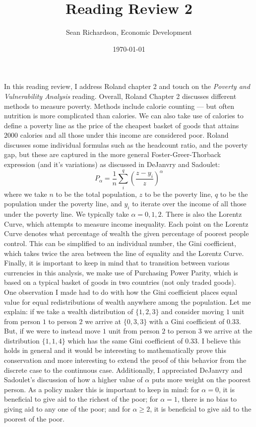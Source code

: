 \documentclass[12pt]{amsart}
\begin{document}
\author{Sean Richardson, Economic Development}
\title{Reading Review 2}
\date{\today}
\maketitle

In this reading review, I address Roland chapter 2 and touch on the
\textit{Poverty and Vulnerability Analysis} reading. Overall, Roland
Chapter 2 discusses different methods to measure poverty. Methods include
calorie counting --- but often nutrition is more complicated than calories.
We can also take use of calories to define a poverty line as the price of
the cheapest basket of goods that attains $2000$ calories and all those
under this income are considered poor. 
Roland discusses some individual formulas such as the headcount ratio, and
the poverty gap, but these are captured in the more general
Foster-Greer-Thorback expression (and it's variations) as discussed in DeJanvry and Sadoulet: 
$$P_\alpha = \frac{1}{n}\sum_i^q\left(\frac{z-y_i}{z}\right)^\alpha$$
where we take $n$ to be the total population, $z$ to be the poverty line,
$q$ to be the population under the poverty line, and $y_i$ to iterate over
the income of all those under the poverty line. We typically take $\alpha =
0,1,2$.
There is also the Lorentz Curve, which attempts to measure income
inequality. Each point on the Lorentz Curve denotes what percentage of
wealth the given percentage of poorest people control. This can be
simplified to an individual number, the Gini coefficient, which takes twice
the area between the line of equality and the Lorentz Curve.
Finally, it is important to keep in mind that to transition between various
currencies in this analysis, we make use of Purchasing Power Parity, which
is based on a typical basket of goods in two countries (not only traded
goods).\\

One observation I made had to do with how the Gini coefficient places equal
value for equal redistributions of wealth anywhere among the population.
Let me explain: if we take a wealth distribution of $\{1,2,3\}$ and
consider moving $1$ unit from person $1$ to person $2$ we arrive at
$\{0,3,3\}$ with a Gini coefficient of $0.33$. But, if we were to instead
move $1$ unit from person $2$ to person $3$ we arrive at the distribution
$\{1,1,4\}$ which has the same Gini coefficient of $0.33$. I believe this
holds in general and it would be interesting to mathematically prove this
conservation and more interesting to extend the proof of this behavior from
the discrete case to the continuous case. Additionally, I appreciated
DeJanvry and Sadoulet's discussion of how a higher value of $\alpha$ puts
more weight on the poorest person. As a policy maker this is important to
keep in mind: for $\alpha = 0$, it is beneficial to give aid to the richest
of the poor; for $\alpha = 1$, there is no bias to giving aid to any one of
the poor; and for $\alpha \geq 2$, it is beneficial to give aid to the poorest
of the poor.
\end{document}
